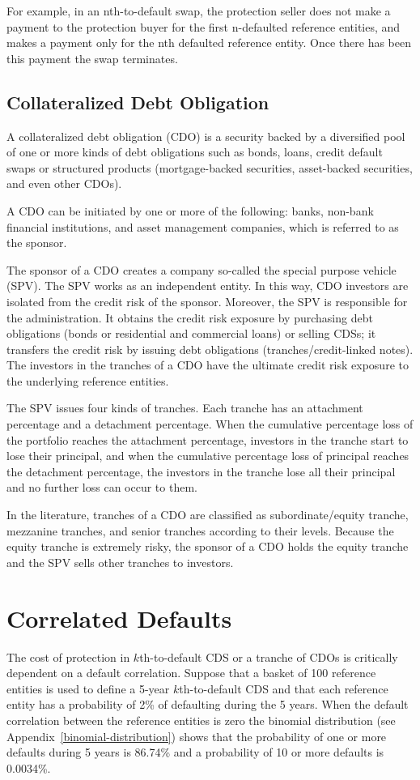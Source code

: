 For example, in an nth-to-default swap, the
protection seller does not make a payment to the protection buyer for
the first n-defaulted reference entities, and makes a payment only for the
nth defaulted reference entity. Once there has been this payment the swap terminates.

\subsection{Collateralized Debt Obligation}\label{collateralized-debt-obligation}

A collateralized debt obligation (CDO) is a security backed by a
diversified pool of one or more kinds of debt obligations such as bonds,
loans, credit default swaps or structured products (mortgage-backed
securities, asset-backed securities, and even other CDOs). 

A CDO can be
initiated by one or more of the following: banks, non-bank financial
institutions, and asset management companies, which is referred to as the
sponsor. 

The sponsor of a CDO creates a company so-called the special
purpose vehicle (SPV). The SPV works as an independent entity. In this
way, CDO investors are isolated from the credit risk of the sponsor.
Moreover, the SPV is responsible for the administration. It obtains
the credit risk exposure by purchasing debt obligations (bonds or
residential and commercial loans) or selling CDSs; it transfers the
credit risk by issuing debt obligations (tranches/credit-linked notes).
The investors in the tranches of a CDO have the ultimate credit risk
exposure to the underlying reference entities. 

The SPV issues four kinds
of tranches. Each tranche has an attachment percentage and a detachment
percentage. When the cumulative percentage loss of the portfolio reaches
the attachment percentage, investors in the tranche start to lose their
principal, and when the cumulative percentage loss of principal reaches
the detachment percentage, the investors in the tranche lose all their
principal and no further loss can occur to them.

In the literature, tranches of a CDO are classified as
subordinate/equity tranche, mezzanine tranches, and senior tranches
according to their levels. Because the equity tranche is
extremely risky, the sponsor of a CDO holds the equity tranche and the
SPV sells other tranches to investors.

\section{Correlated Defaults}\label{correlated-defaults}
The cost of protection in $k$th-to-default CDS or a tranche of CDOs is critically dependent
on a default correlation. Suppose that a basket of 100 reference entities is used to define a 5-year
$k$th-to-default CDS and that each reference entity has a probability of 2\% of defaulting during the 
5 years. When the default correlation between the reference entities is zero the binomial distribution (see Appendix~\ref{binomial-distribution}) 
shows that the probability of one or more defaults during 5 years is 86.74\% and a probability of 10 or more defaults is 0.0034\%.

